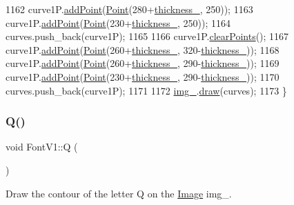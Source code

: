 \begin{DoxyCode}
1162     curve1P.\mbox{\hyperlink{class_bezier_curve_a38d16c18b36ae45619b05e26e226cf34}{addPoint}}(\mbox{\hyperlink{class_point}{Point}}(280+\mbox{\hyperlink{class_font_v1_aed8040e76be9a52833627b92f0fb4e5f}{thickness\_}}, 250));
1163     curve1P.\mbox{\hyperlink{class_bezier_curve_a38d16c18b36ae45619b05e26e226cf34}{addPoint}}(\mbox{\hyperlink{class_point}{Point}}(230+\mbox{\hyperlink{class_font_v1_aed8040e76be9a52833627b92f0fb4e5f}{thickness\_}}, 250));
1164     curves.push\_back(curve1P);
1165 
1166     curve1P.\mbox{\hyperlink{class_bezier_curve_a0ba8ce66d5af5971ae6a1b506029728e}{clearPoints}}();
1167     curve1P.\mbox{\hyperlink{class_bezier_curve_a38d16c18b36ae45619b05e26e226cf34}{addPoint}}(\mbox{\hyperlink{class_point}{Point}}(260+\mbox{\hyperlink{class_font_v1_aed8040e76be9a52833627b92f0fb4e5f}{thickness\_}}, 320-\mbox{\hyperlink{class_font_v1_aed8040e76be9a52833627b92f0fb4e5f}{thickness\_}}));
1168     curve1P.\mbox{\hyperlink{class_bezier_curve_a38d16c18b36ae45619b05e26e226cf34}{addPoint}}(\mbox{\hyperlink{class_point}{Point}}(260+\mbox{\hyperlink{class_font_v1_aed8040e76be9a52833627b92f0fb4e5f}{thickness\_}}, 290-\mbox{\hyperlink{class_font_v1_aed8040e76be9a52833627b92f0fb4e5f}{thickness\_}}));
1169     curve1P.\mbox{\hyperlink{class_bezier_curve_a38d16c18b36ae45619b05e26e226cf34}{addPoint}}(\mbox{\hyperlink{class_point}{Point}}(230+\mbox{\hyperlink{class_font_v1_aed8040e76be9a52833627b92f0fb4e5f}{thickness\_}}, 290-\mbox{\hyperlink{class_font_v1_aed8040e76be9a52833627b92f0fb4e5f}{thickness\_}}));
1170     curves.push\_back(curve1P);
1171 
1172     \mbox{\hyperlink{class_font_v1_a00569e3e3c4b70f437b63f396f735fb0}{img\_}}.\mbox{\hyperlink{class_image_a8d162f3cab956131d58708c09aa560b0}{draw}}(curves);
1173 \}
\end{DoxyCode}
\mbox{\label{class_font_v1_af7ffd76bf02756d0d1e2d3eab4c65c40}} 
\subsubsection{\texorpdfstring{Q()}{Q()}}
{\footnotesize\ttfamily void Font\+V1\+::Q (\begin{DoxyParamCaption}{ }\end{DoxyParamCaption})}



Draw the contour of the letter Q on the \mbox{\hyperlink{class_image}{Image}} img\+\_\+. 


